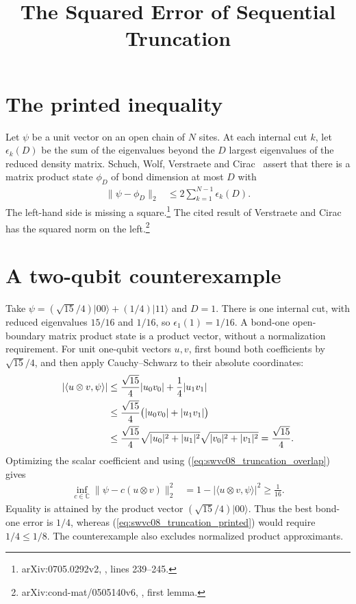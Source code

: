 \documentclass{article}
\title{The Squared Error of Sequential Truncation}
\author{}
\date{}
\begin{document}
\maketitle
{}

\section{The printed inequality}

Let $\psi$ be a unit vector on an open chain of $N$ sites. At each internal
cut $k$, let $\epsilon_k(D)$ be the sum of the eigenvalues beyond the $D$
largest eigenvalues of the reduced density matrix.
Schuch, Wolf, Verstraete and Cirac~\cite{Schuch2008EntropyScaling} assert
that there is a matrix product state $\phi_D$ of bond dimension at most $D$
with
\begin{align}
    \|\psi-\phi_D\|_2 & \le 2\sum_{k=1}^{N-1}\epsilon_k(D).
    \label{eq:swvc08_truncation_printed}
\end{align}
The left-hand side is missing a square.\footnote{arXiv:0705.0292v2,
    , lines 239--245.}
The cited result of Verstraete and Cirac~\cite[Lemma~1]{VerstraeteCirac2006Faithfully}
has the squared norm on the left.\footnote{arXiv:cond-mat/0505140v6,
    , first lemma.}

\section{A two-qubit counterexample}

Take $\psi=(\sqrt{15}/4)|00\rangle+(1/4)|11\rangle$ and $D=1$.
There is one internal cut, with reduced eigenvalues $15/16$ and $1/16$,
so $\epsilon_1(1)=1/16$. A bond-one open-boundary matrix product state is
a product vector, without a normalization requirement.
For unit one-qubit vectors $u,v$, first bound both coefficients by
$\sqrt{15}/4$, and then apply Cauchy--Schwarz to their absolute coordinates:
\begin{align}
    |\langle u\otimes v,\psi\rangle|
     & \le\frac{\sqrt{15}}4|u_0v_0|+\frac14|u_1v_1|\notag      \\
     & \le\frac{\sqrt{15}}4\bigl(|u_0v_0|+|u_1v_1|\bigr)\notag \\
     & \le\frac{\sqrt{15}}4
    \sqrt{|u_0|^2+|u_1|^2}\sqrt{|v_0|^2+|v_1|^2}
    =\frac{\sqrt{15}}4.
    \label{eq:swvc08_truncation_overlap}
\end{align}
Optimizing the scalar coefficient and using
(\ref{eq:swvc08_truncation_overlap}) gives
\begin{align}
    \inf_{c\in\mathbb C}\|\psi-c(u\otimes v)\|_2^2
     & =1-|\langle u\otimes v,\psi\rangle|^2\ge\frac1{16}.
    \label{eq:swvc08_truncation_product}
\end{align}
Equality is attained by the product vector $(\sqrt{15}/4)|00\rangle$.
Thus the best bond-one error is $1/4$, whereas
(\ref{eq:swvc08_truncation_printed}) would require $1/4\le1/8$.
The counterexample also excludes normalized product approximants.
\end{document}
